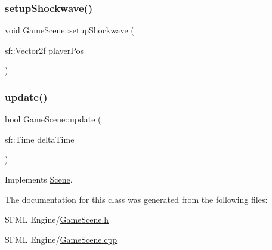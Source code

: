 \mbox{\label{class_game_scene_a67664e1bbce6bec9eda855a9b109d9ec}} 
\subsubsection{\texorpdfstring{setup\+Shockwave()}{setupShockwave()}}
{\footnotesize\ttfamily void Game\+Scene\+::setup\+Shockwave (\begin{DoxyParamCaption}\item[{sf\+::\+Vector2f}]{player\+Pos }\end{DoxyParamCaption})}

\mbox{\label{class_game_scene_ae54628d2f041bcad66242584b2db10d6}} 
\subsubsection{\texorpdfstring{update()}{update()}}
{\footnotesize\ttfamily bool Game\+Scene\+::update (\begin{DoxyParamCaption}\item[{sf\+::\+Time}]{delta\+Time }\end{DoxyParamCaption})\hspace{0.3cm}{\ttfamily [virtual]}}



Implements \hyperlink{class_scene_a72683c984a1da2ce4f757705e93730f2}{Scene}.



The documentation for this class was generated from the following files\+:\begin{DoxyCompactItemize}
\item 
S\+F\+M\+L Engine/\hyperlink{_game_scene_8h}{Game\+Scene.\+h}\item 
S\+F\+M\+L Engine/\hyperlink{_game_scene_8cpp}{Game\+Scene.\+cpp}\end{DoxyCompactItemize}
